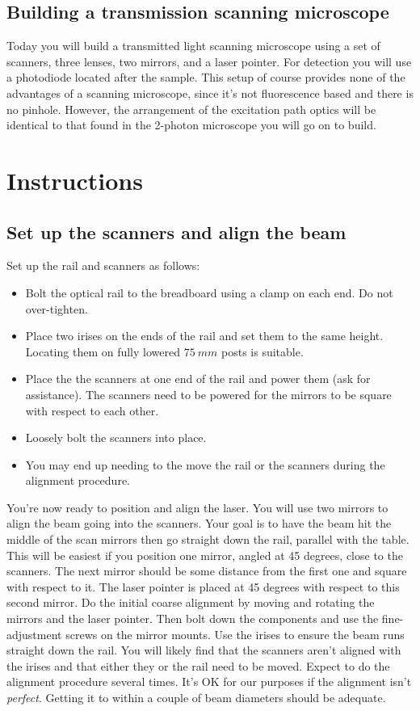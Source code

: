 \documentclass[a4paper]{report}
\begin{document}
\subsection{Building a transmission scanning microscope}
Today you will build a transmitted light scanning microscope using a set of scanners, three lenses, two mirrors, and a laser pointer.
For detection you will use a photodiode located after the sample. 
This setup of course provides none of the advantages of a scanning microscope, since it's not fluorescence based and there is no pinhole. 
However, the arrangement of the excitation path optics will be identical to that found in the 2-photon microscope you will go on to build. 

\section{Instructions}

\subsection{Set up the scanners and align the beam}
Set up the rail and scanners as follows:
\begin{itemize}
\setlength\itemsep{0.15em}
\item Bolt the optical rail to the breadboard using a clamp on each end. Do not over-tighten. 
\item Place two irises on the ends of the rail and set them to the same height. 
Locating them on fully lowered $75~mm$ posts is suitable. 
\item Place the the scanners at one end of the rail and power them (ask for assistance).
The scanners need to be powered for the mirrors to be square with respect to each other. 
\item Loosely bolt the scanners into place. 
\item You may end up needing to the move the rail or the scanners during the alignment procedure.
\end{itemize}

\vspace{1.5em}

You're now ready to position and align the laser. 
You will use two mirrors to align the beam going into the scanners.
Your goal is to have the beam hit the middle of the scan mirrors then go straight down the rail, parallel with the table. 
This will be easiest if you position one mirror, angled at 45 degrees, close to the scanners.
The next mirror should be some distance from the first one and square with respect to it. 
The laser pointer is placed at 45 degrees with respect to this second mirror. 
Do the initial coarse alignment by moving and rotating the mirrors and the laser pointer. 
Then bolt down the components and use the fine-adjustment screws on the mirror mounts. 
Use the irises to ensure the beam runs straight down the rail. 
You will likely find that the scanners aren't aligned with the irises and that either they or the rail need to be moved. 
Expect to do the alignment procedure several times. 
It's OK for our purposes if the alignment isn't \textit{perfect}. 
Getting it to within a couple of beam diameters should be adequate. 
\end{document}

